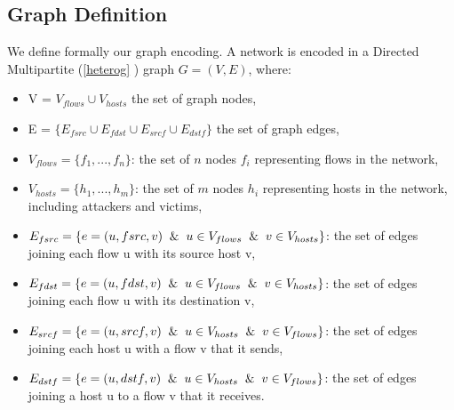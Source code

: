 \subsection{Graph Definition}
We define formally our graph encoding. A network is encoded in a Directed Multipartite (\ref{heterog} ) graph $G = (V, E)$, where: 
\begin{itemize}
    \item V = $V_{flows}  \cup  V_{hosts}$ the set of graph nodes,
    \item E = $\{ E_{fsrc}  \cup  E_{fdst}  \cup  E_{srcf}  \cup  E_{dstf}  \}$ the set of graph edges,
    \item $V_{flows} = \{ f_1, ... , f_n \}$: the set of $n$ nodes $f_i$ representing flows in the network,
    \item $V_{hosts} = \{ h_1, ... , h_m \}$: the set of $m$ nodes $h_i$ representing hosts in the network, including attackers and victims,
    \item $E_{fsrc} = \{ e = (u, fsrc , v) \And u \in V_{flows} \And v \in V_{hosts} \}$: the set of edges joining each flow u with its source host v,
    \item $E_{fdst} = \{  e = (u, fdst, v) \And u \in V_{flows}  \And v \in V_{hosts}  \}$: the set of edges joining each flow u with its destination v,
    \item $E_{srcf} = \{  e = (u, srcf , v) \And u \in V_{hosts} \And  v \in V_{flows}  \}$: the set of edges joining each host u with a flow v that it sends,
    \item $E_{dstf} = \{  e = (u, dstf , v) \And u \in V_{hosts} \And  v \in V_{flows}  \}$: the set of edges joining a host u to a flow v that it receives.
\end{itemize}

